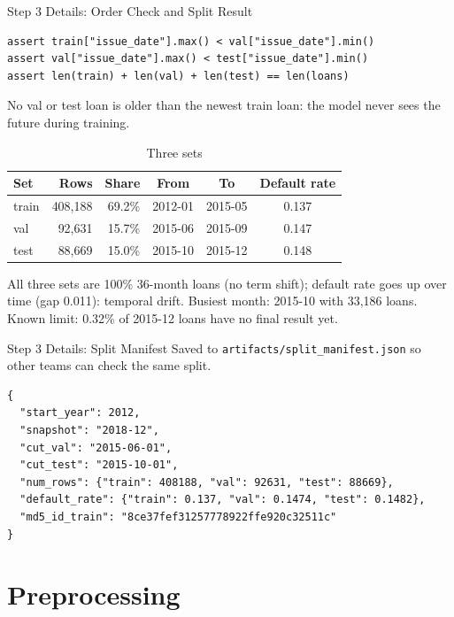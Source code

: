 \documentclass{beamer}
\newcommand{\code}[1]{\texttt{\small #1}}
\begin{document}
\begin{frame}[fragile]{Step 3 Details: Order Check and Split Result}
\begin{lstlisting}
assert train["issue_date"].max() < val["issue_date"].min()
assert val["issue_date"].max() < test["issue_date"].min()
assert len(train) + len(val) + len(test) == len(loans)
\end{lstlisting}
  No val or test loan is older than the newest train loan: the model never sees the future during training.
  \begin{table}
    \centering
    \scriptsize
    \caption{Three sets}
    \begin{tabular}{lrrccc}
      \hline
      \textbf{Set} & \textbf{Rows} & \textbf{Share} & \textbf{From} & \textbf{To} & \textbf{Default rate}\\
      \hline
      train & 408,188 & 69.2\% & 2012-01 & 2015-05 & 0.137\\
      val & 92,631 & 15.7\% & 2015-06 & 2015-09 & 0.147\\
      test & 88,669 & 15.0\% & 2015-10 & 2015-12 & 0.148\\
      \hline
    \end{tabular}
  \end{table}
  \scriptsize All three sets are 100\% 36-month loans (no term shift); default rate goes up over time (gap 0.011): temporal drift. Busiest month: 2015-10 with 33,186 loans. Known limit: 0.32\% of 2015-12 loans have no final result yet.
\end{frame}

\begin{frame}[fragile]{Step 3 Details: Split Manifest}
  Saved to \code{artifacts/split\_manifest.json} so other teams can check the same split.
\begin{lstlisting}
{
  "start_year": 2012,
  "snapshot": "2018-12",
  "cut_val": "2015-06-01",
  "cut_test": "2015-10-01",
  "num_rows": {"train": 408188, "val": 92631, "test": 88669},
  "default_rate": {"train": 0.137, "val": 0.1474, "test": 0.1482},
  "md5_id_train": "8ce37fef31257778922ffe920c32511c"
}
\end{lstlisting}
\end{frame}

\section{Preprocessing}
\end{document}
